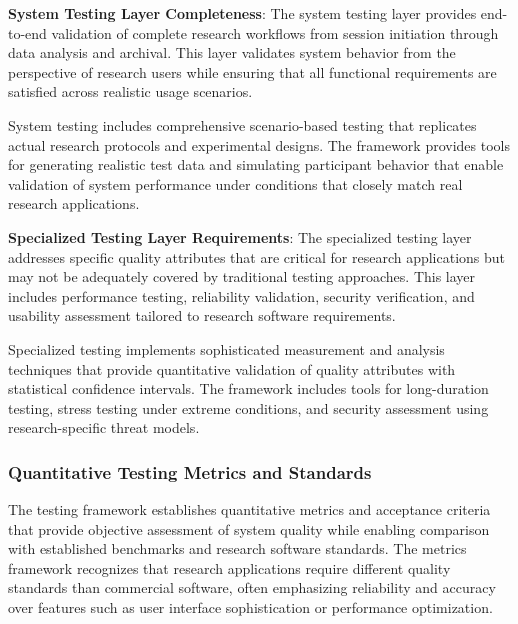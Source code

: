 \documentclass[12pt,a4paper]{report}
\begin{document}
\textbf{System Testing Layer Completeness}: The system testing layer provides end-to-end validation of complete research
workflows from session initiation through data analysis and archival. This layer validates system behavior from the
perspective of research users while ensuring that all functional requirements are satisfied across realistic usage
scenarios.

System testing includes comprehensive scenario-based testing that replicates actual research protocols and experimental
designs. The framework provides tools for generating realistic test data and simulating participant behavior that enable
validation of system performance under conditions that closely match real research applications.

\textbf{Specialized Testing Layer Requirements}: The specialized testing layer addresses specific quality attributes that are
critical for research applications but may not be adequately covered by traditional testing approaches. This layer
includes performance testing, reliability validation, security verification, and usability assessment tailored to
research software requirements.

Specialized testing implements sophisticated measurement and analysis techniques that provide quantitative validation of
quality attributes with statistical confidence intervals. The framework includes tools for long-duration testing, stress
testing under extreme conditions, and security assessment using research-specific threat models.

\subsubsection{Quantitative Testing Metrics and Standards}

The testing framework establishes quantitative metrics and acceptance criteria that provide objective assessment of
system quality while enabling comparison with established benchmarks and research software standards. The metrics
framework recognizes that research applications require different quality standards than commercial software, often
emphasizing reliability and accuracy over features such as user interface sophistication or performance optimization.
\end{document}
